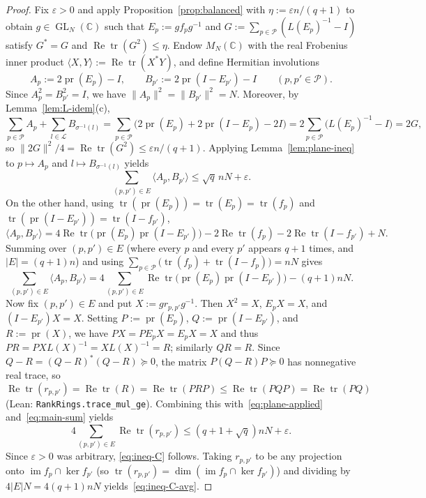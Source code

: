 \documentclass[11pt]{article}
\theoremstyle{definition}
\theoremstyle{remark}
\numberwithin{equation}{section}
\DeclareMathOperator{\tr}{tr}
\DeclareMathOperator{\pr}{pr}
\DeclareMathOperator{\im}{im}
\DeclareMathOperator{\GL}{GL}
\DeclareMathOperator{\RePart}{Re}
\newcommand{\C}{\mathbb{C}}
\newcommand{\PP}{\mathcal{P}}
\newcommand{\LL}{\mathcal{L}}
\newcommand{\1}{\mathbf{1}}
\newcommand{\code}[1]{{\normalfont\small\texttt{#1}}}
\begin{document}
\begin{proof}
Fix $\varepsilon > 0$ and apply Proposition~\ref{prop:balanced} with $\eta := \varepsilon n / (q + 1)$ to obtain $g \in \GL_N(\C)$ such that $E_p := g f_p g^{-1}$ and $G := \sum_{p \in \PP}(L(E_p)^{-1} - I)$ satisfy $G^* = G$ and $\RePart\tr(G^2) \le \eta$. Endow $M_N(\C)$ with the real Frobenius inner product $\langle X, Y \rangle := \RePart\tr(X^* Y)$, and define Hermitian involutions
\[
A_p := 2\pr(E_p) - I, \qquad B_{p'} := 2\pr(I - E_{p'}) - I \qquad (p, p' \in \PP).
\]
Since $A_p^2 = B_{p'}^2 = I$, we have $\|A_p\|^2 = \|B_{p'}\|^2 = N$. Moreover, by Lemma~\ref{lem:L-idem}(c),
\[
\sum_{p \in \PP} A_p + \sum_{l \in \LL} B_{\sigma^{-1}(l)}
= \sum_{p \in \PP} \bigl(2\pr(E_p) + 2\pr(I - E_p) - 2I\bigr)
= 2\sum_{p \in \PP} \bigl(L(E_p)^{-1} - I\bigr) = 2G,
\]
so $\|2G\|^2 / 4 = \RePart\tr(G^2) \le \varepsilon n / (q + 1)$. Applying Lemma~\ref{lem:plane-ineq} to $p \mapsto A_p$ and $l \mapsto B_{\sigma^{-1}(l)}$ yields
\begin{equation}
\label{eq:plane-applied}
\sum_{(p, p') \in E} \langle A_p, B_{p'} \rangle \le \sqrt{q}\, n N + \varepsilon.
\end{equation}
On the other hand, using $\tr(\pr(E_p)) = \tr(E_p) = \tr(f_p)$ and $\tr(\pr(I - E_{p'})) = \tr(I - f_{p'})$,
\[
\langle A_p, B_{p'} \rangle = 4\RePart\tr\bigl(\pr(E_p)\pr(I - E_{p'})\bigr) - 2\RePart\tr(f_p) - 2\RePart\tr(I - f_{p'}) + N.
\]
Summing over $(p, p') \in E$ (where every $p$ and every $p'$ appears $q+1$ times, and $|E| = (q+1)n$) and using $\sum_{p \in \PP}\bigl(\tr(f_p) + \tr(I - f_p)\bigr) = n N$ gives
\begin{equation}
\label{eq:main-sum}
\sum_{(p, p') \in E} \langle A_p, B_{p'} \rangle
= 4\sum_{(p, p') \in E} \RePart\tr\bigl(\pr(E_p)\pr(I - E_{p'})\bigr) - (q + 1) n N.
\end{equation}
Now fix $(p, p') \in E$ and put $X := g r_{p, p'} g^{-1}$. Then $X^2 = X$, $E_p X = X$, and $(I - E_{p'})X = X$. Setting $P := \pr(E_p)$, $Q := \pr(I - E_{p'})$, and $R := \pr(X)$, we have $P X = P E_p X = E_p X = X$ and thus $P R = P X L(X)^{-1} = X L(X)^{-1} = R$; similarly $Q R = R$. Since $Q - R = (Q - R)^*(Q - R) \succeq 0$, the matrix $P(Q - R)P \succeq 0$ has nonnegative real trace, so
\[
\RePart\tr(r_{p, p'}) = \RePart\tr(R) = \RePart\tr(PRP) \le \RePart\tr(PQP) = \RePart\tr(PQ)
\]
(Lean: \code{RankRings.trace\_mul\_ge}). Combining this with~\eqref{eq:plane-applied} and~\eqref{eq:main-sum} yields
\[
4\sum_{(p, p') \in E} \RePart\tr(r_{p, p'}) \le (q + 1 + \sqrt{q}) n N + \varepsilon.
\]
Since $\varepsilon > 0$ was arbitrary, \eqref{eq:ineq-C} follows. Taking $r_{p, p'}$ to be any projection onto $\im f_p \cap \ker f_{p'}$ (so $\tr(r_{p, p'}) = \dim(\im f_p \cap \ker f_{p'})$) and dividing by $4|E|N = 4(q+1)nN$ yields~\eqref{eq:ineq-C-avg}.
\end{proof}
\end{document}
